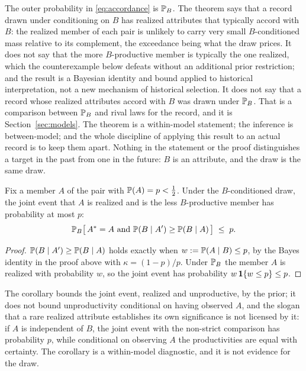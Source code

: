 \begin{remark}
\label{rem:scope}
The outer probability in \eqref{eq:accordance} is $\mathbb{P}_B$. The theorem
says that a record drawn under conditioning on $B$ has realized
attributes that typically accord with $B$: the realized member of each pair is unlikely to carry very small $B$-conditioned mass relative to its complement, the exceedance being what the draw prices. It does not say that the more $B$-productive member is typically the one realized, which the counterexample below defeats without an additional prior restriction; and the result is a Bayesian identity and bound applied to historical interpretation, not a new mechanism of historical selection. It does not say that a record whose realized attributes
accord with $B$ was drawn under $\mathbb{P}_B$. That is a comparison between
$\mathbb{P}_B$ and rival laws for the record, and it is Section~\ref{sec:models}.
The theorem is a within-model statement; the inference is between-model;
and the whole discipline of applying this result to an actual record is
to keep them apart. Nothing in the statement or the proof distinguishes a
target in the past from one in the future: $B$ is an attribute, and the
draw is the same draw.
\end{remark}

\begin{corollary}\label{cor:prior}
Fix a member $A$ of the pair with $\mathbb{P}(A)=p<\tfrac12$. Under the
$B$-conditioned draw, the joint event that $A$ is realized and is the
less $B$-productive member has probability at most $p$:
\begin{equation}\label{eq:prior}
\mathbb{P}_B\bigl[\,A^\ast=A\ \text{and}\ \mathbb{P}(B\mid A')\ge\mathbb{P}(B\mid A)\,\bigr]\;\le\;p.
\end{equation}
\end{corollary}

\begin{proof}
$\mathbb{P}(B\mid A')\ge\mathbb{P}(B\mid A)$ holds exactly when $w:=\mathbb{P}(A\mid B)\le p$,
by the Bayes identity in the proof above with $\kappa=(1-p)/p$. Under
$\mathbb{P}_B$ the member $A$ is realized with probability $w$, so the joint
event has probability $w\,\mathbf{1}\{w\le p\}\le p$.
\end{proof}

\noindent The corollary bounds the joint event, realized and unproductive, by the prior; it does not bound unproductivity conditional on having observed $A$, and the slogan that a rare realized attribute establishes its own significance is not licensed by it: if $A$ is independent of $B$, the joint event with the non-strict comparison has probability $p$, while conditional on observing $A$ the productivities are equal with certainty. The corollary is a within-model
diagnostic, and it is not evidence for the draw.

